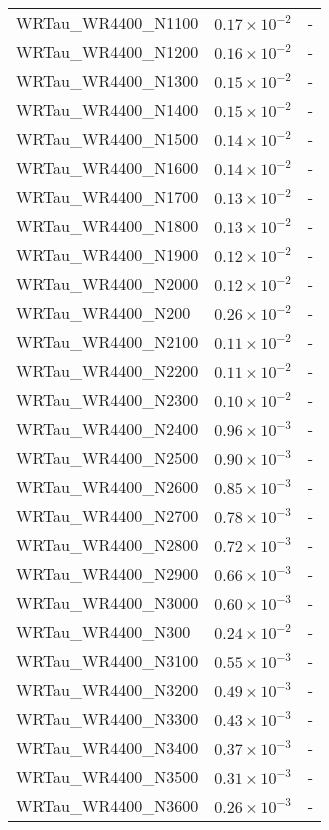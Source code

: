 \begin{longtable}[c]{| C{.35\textwidth} | C{.15\textwidth} | C{.1\textwidth}|}
    WRTau\_WR4400\_N1100 & $0.17\times10^{-2}$ & - \\
    WRTau\_WR4400\_N1200 & $0.16\times10^{-2}$ & - \\
    WRTau\_WR4400\_N1300 & $0.15\times10^{-2}$ & - \\
    WRTau\_WR4400\_N1400 & $0.15\times10^{-2}$ & - \\
    WRTau\_WR4400\_N1500 & $0.14\times10^{-2}$ & - \\
    WRTau\_WR4400\_N1600 & $0.14\times10^{-2}$ & - \\
    WRTau\_WR4400\_N1700 & $0.13\times10^{-2}$ & - \\
    WRTau\_WR4400\_N1800 & $0.13\times10^{-2}$ & - \\
    WRTau\_WR4400\_N1900 & $0.12\times10^{-2}$ & - \\
    WRTau\_WR4400\_N2000 & $0.12\times10^{-2}$ & - \\
    WRTau\_WR4400\_N200 & $0.26\times10^{-2}$ & - \\
    WRTau\_WR4400\_N2100 & $0.11\times10^{-2}$ & - \\
    WRTau\_WR4400\_N2200 & $0.11\times10^{-2}$ & - \\
    WRTau\_WR4400\_N2300 & $0.10\times10^{-2}$ & - \\
    WRTau\_WR4400\_N2400 & $0.96\times10^{-3}$ & - \\
    WRTau\_WR4400\_N2500 & $0.90\times10^{-3}$ & - \\
    WRTau\_WR4400\_N2600 & $0.85\times10^{-3}$ & - \\
    WRTau\_WR4400\_N2700 & $0.78\times10^{-3}$ & - \\
    WRTau\_WR4400\_N2800 & $0.72\times10^{-3}$ & - \\
    WRTau\_WR4400\_N2900 & $0.66\times10^{-3}$ & - \\
    WRTau\_WR4400\_N3000 & $0.60\times10^{-3}$ & - \\
    WRTau\_WR4400\_N300 & $0.24\times10^{-2}$ & - \\
    WRTau\_WR4400\_N3100 & $0.55\times10^{-3}$ & - \\
    WRTau\_WR4400\_N3200 & $0.49\times10^{-3}$ & - \\
    WRTau\_WR4400\_N3300 & $0.43\times10^{-3}$ & - \\
    WRTau\_WR4400\_N3400 & $0.37\times10^{-3}$ & - \\
    WRTau\_WR4400\_N3500 & $0.31\times10^{-3}$ & - \\
    WRTau\_WR4400\_N3600 & $0.26\times10^{-3}$ & - \\

\end{longtable}
